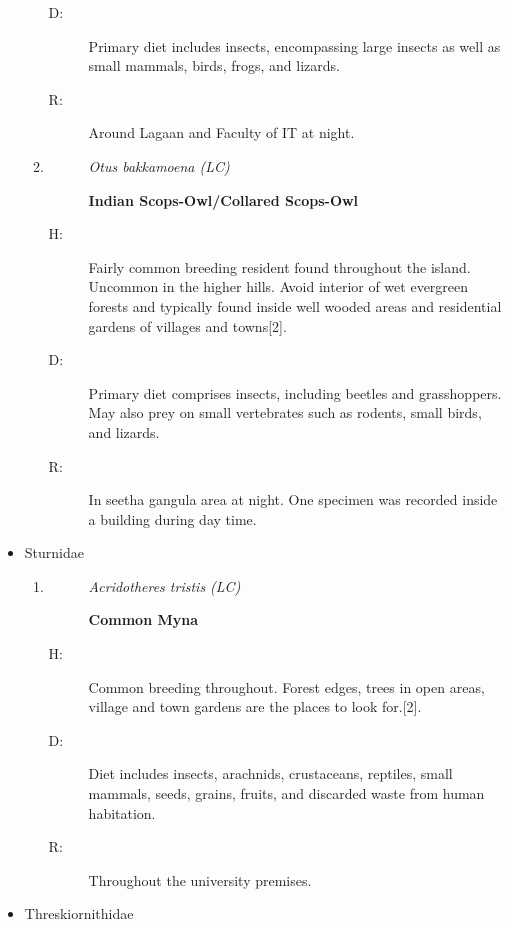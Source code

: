 \begin{itemize}
\begin{enumerate}
\begin{description}
\item[D: ]%
Primary diet includes insects, encompassing large insects as well as small mammals, birds, frogs, and lizards.%
\item[R: ]%
Around Lagaan and Faculty of IT at night.%
\end{description}%
\item%
\begin{description}%
\item[]%
\textit{Otus bakkamoena (LC)}%
\item[]%
\textbf{Indian Scops{-}Owl/Collared Scops{-}Owl}%
\end{description}%
\begin{description}%
\item[H: ]%
Fairly common breeding resident found throughout the island. Uncommon in the higher hills. Avoid interior of wet evergreen forests and typically found inside well wooded areas and residential gardens of villages and towns{[}2{]}.%
\item[D: ]%
Primary diet comprises insects, including beetles and grasshoppers. May also prey on small vertebrates such as rodents, small birds, and lizards.%
\item[R: ]%
In seetha gangula area at night. One specimen was recorded inside a building during day time.%
\end{description}%
\end{enumerate}%
\item%
Sturnidae%
\begin{enumerate}%
\item%
\begin{description}%
\item[]%
\textit{Acridotheres tristis (LC)}%
\item[]%
\textbf{Common Myna}%
\end{description}%
\begin{description}%
\item[H: ]%
Common breeding throughout. Forest edges, trees in open areas, village and town gardens are the places to look for.{[}2{]}.%
\item[D: ]%
Diet includes insects, arachnids, crustaceans, reptiles, small mammals, seeds, grains, fruits, and discarded waste from human habitation.%
\item[R: ]%
Throughout the university premises.%
\end{description}%
\end{enumerate}%
\item%
Threskiornithidae%

\end{itemize}
